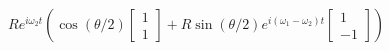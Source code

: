 \documentclass[preview]{standalone}
\begin{document}
\begin{center}
$R e^{i \omega_2 t}\left(\cos(\theta/2) \begin{bmatrix} 1 \\ 1\end{bmatrix} + R \sin(\theta/2) e^{i (\omega_1-\omega_2) t}\begin{bmatrix} 1 \\ -1\end{bmatrix}\right)$
\end{center}
\end{document}
